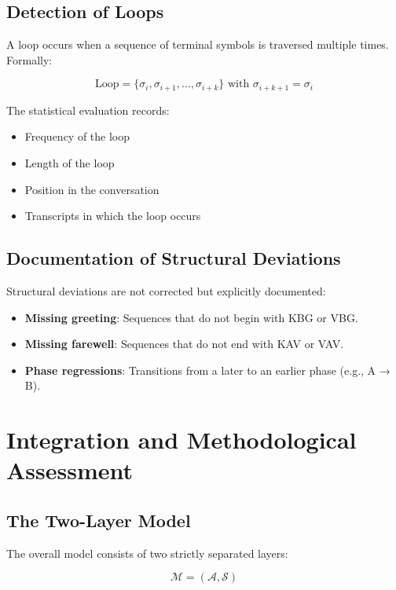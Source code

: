 \documentclass[
  12pt,
  a4paper,
  oneside,
  titlepage
]{article}
\begin{document}
\subsection{Detection of Loops}

A loop occurs when a sequence of terminal symbols is traversed multiple times. 
Formally:

\[
\text{Loop} = \{\sigma_i, \sigma_{i+1}, \ldots, \sigma_{i+k}\} \text{ with } \sigma_{i+k+1} = \sigma_i
\]

The statistical evaluation records:
\begin{itemize}
    \item Frequency of the loop
    \item Length of the loop
    \item Position in the conversation
    \item Transcripts in which the loop occurs
\end{itemize}

\subsection{Documentation of Structural Deviations}

Structural deviations are not corrected but explicitly documented:

\begin{itemize}
    \item \textbf{Missing greeting}: Sequences that do not begin with KBG 
    or VBG.
    
    \item \textbf{Missing farewell}: Sequences that do not end with KAV 
    or VAV.
    
    \item \textbf{Phase regressions}: Transitions from a later to an earlier 
    phase (e.g., A → B).
\end{itemize}

\section{Integration and Methodological Assessment}

\subsection{The Two-Layer Model}

The overall model consists of two strictly separated layers:

\[
\mathcal{M} = (\mathcal{A}, \mathcal{S})
\]
\end{document}
